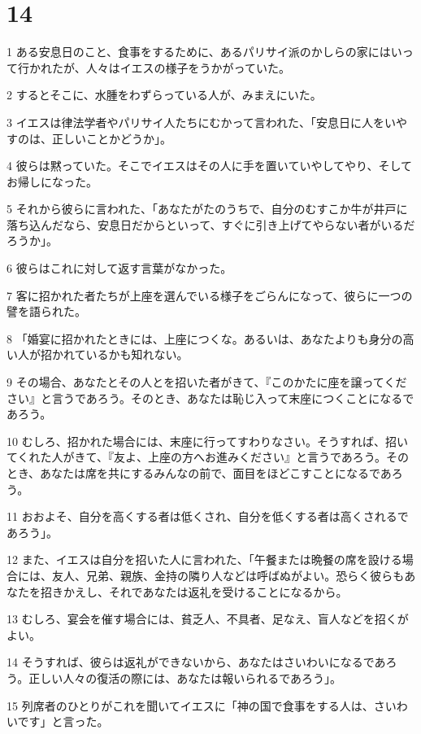 \chapter{14}

\par 1 ある安息日のこと、食事をするために、あるパリサイ派のかしらの家にはいって行かれたが、人々はイエスの様子をうかがっていた。
\par 2 するとそこに、水腫をわずらっている人が、みまえにいた。
\par 3 イエスは律法学者やパリサイ人たちにむかって言われた、「安息日に人をいやすのは、正しいことかどうか」。
\par 4 彼らは黙っていた。そこでイエスはその人に手を置いていやしてやり、そしてお帰しになった。
\par 5 それから彼らに言われた、「あなたがたのうちで、自分のむすこか牛が井戸に落ち込んだなら、安息日だからといって、すぐに引き上げてやらない者がいるだろうか」。
\par 6 彼らはこれに対して返す言葉がなかった。
\par 7 客に招かれた者たちが上座を選んでいる様子をごらんになって、彼らに一つの譬を語られた。
\par 8 「婚宴に招かれたときには、上座につくな。あるいは、あなたよりも身分の高い人が招かれているかも知れない。
\par 9 その場合、あなたとその人とを招いた者がきて、『このかたに座を譲ってください』と言うであろう。そのとき、あなたは恥じ入って末座につくことになるであろう。
\par 10 むしろ、招かれた場合には、末座に行ってすわりなさい。そうすれば、招いてくれた人がきて、『友よ、上座の方へお進みください』と言うであろう。そのとき、あなたは席を共にするみんなの前で、面目をほどこすことになるであろう。
\par 11 おおよそ、自分を高くする者は低くされ、自分を低くする者は高くされるであろう」。
\par 12 また、イエスは自分を招いた人に言われた、「午餐または晩餐の席を設ける場合には、友人、兄弟、親族、金持の隣り人などは呼ばぬがよい。恐らく彼らもあなたを招きかえし、それであなたは返礼を受けることになるから。
\par 13 むしろ、宴会を催す場合には、貧乏人、不具者、足なえ、盲人などを招くがよい。
\par 14 そうすれば、彼らは返礼ができないから、あなたはさいわいになるであろう。正しい人々の復活の際には、あなたは報いられるであろう」。
\par 15 列席者のひとりがこれを聞いてイエスに「神の国で食事をする人は、さいわいです」と言った。
